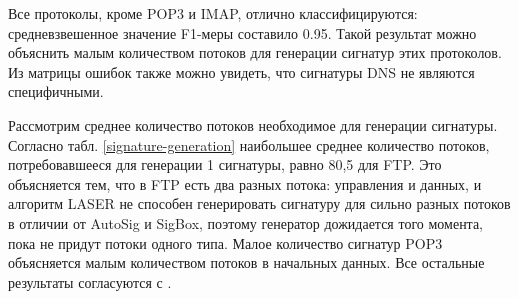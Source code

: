 Все протоколы, кроме POP3 и IMAP, отлично классифицируются: средневзвешенное значение F1-меры составило 0.95.
Такой результат можно объяснить малым количеством потоков для генерации сигнатур этих протоколов.
Из матрицы ошибок также можно увидеть, что сигнатуры DNS не являются специфичными.

Рассмотрим среднее количество потоков необходимое для генерации сигнатуры.
Согласно табл. \ref{signature-generation} наибольшее среднее количество потоков, потребовавшееся для генерации 1 сигнатуры, равно 80,5 для FTP.
Это объясняется тем, что в FTP есть два разных потока: управления и данных,
и алгоритм LASER не способен генерировать сигнатуру для сильно разных потоков в отличии от AutoSig и SigBox,
поэтому генератор дожидается того момента, пока не придут потоки одного типа.
Малое количество сигнатур POP3 объясняется малым количеством потоков в начальных данных. Все остальные результаты согласуются с \cite{santosautomatic}.

\begin{table}[ht!]
    \caption{Среднее количество потоков необходимое для генерации сигнатуры.}
    \label{signature-generation}
    \centering
\end{table}

